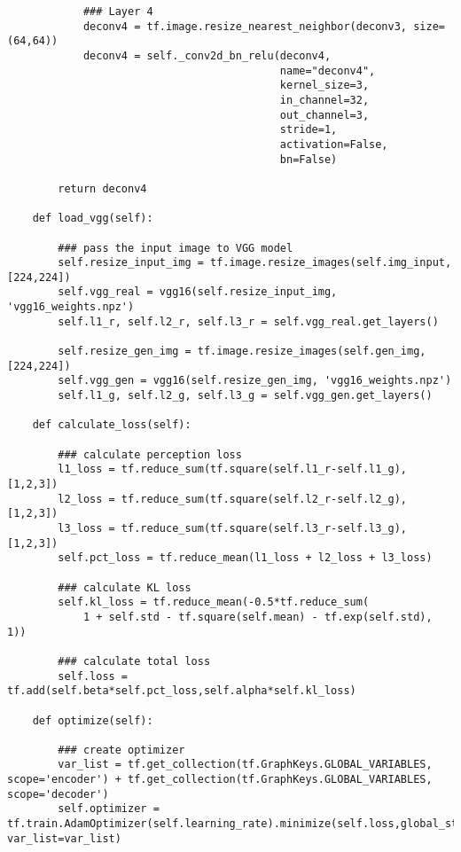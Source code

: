 \begin{footnotesize}
\begin{lstlisting}
            ### Layer 4
            deconv4 = tf.image.resize_nearest_neighbor(deconv3, size=(64,64))
            deconv4 = self._conv2d_bn_relu(deconv4,
                                           name="deconv4",
                                           kernel_size=3,
                                           in_channel=32,
                                           out_channel=3,
                                           stride=1,
                                           activation=False,
                                           bn=False)
            
        return deconv4
    
    def load_vgg(self):
        
        ### pass the input image to VGG model
        self.resize_input_img = tf.image.resize_images(self.img_input, [224,224])
        self.vgg_real = vgg16(self.resize_input_img, 'vgg16_weights.npz')
        self.l1_r, self.l2_r, self.l3_r = self.vgg_real.get_layers()
        
        self.resize_gen_img = tf.image.resize_images(self.gen_img, [224,224])
        self.vgg_gen = vgg16(self.resize_gen_img, 'vgg16_weights.npz')
        self.l1_g, self.l2_g, self.l3_g = self.vgg_gen.get_layers()
        
    def calculate_loss(self):
        
        ### calculate perception loss
        l1_loss = tf.reduce_sum(tf.square(self.l1_r-self.l1_g), [1,2,3])
        l2_loss = tf.reduce_sum(tf.square(self.l2_r-self.l2_g), [1,2,3])
        l3_loss = tf.reduce_sum(tf.square(self.l3_r-self.l3_g), [1,2,3])
        self.pct_loss = tf.reduce_mean(l1_loss + l2_loss + l3_loss)
        
        ### calculate KL loss
        self.kl_loss = tf.reduce_mean(-0.5*tf.reduce_sum(
            1 + self.std - tf.square(self.mean) - tf.exp(self.std), 1))
        
        ### calculate total loss
        self.loss = tf.add(self.beta*self.pct_loss,self.alpha*self.kl_loss)
        
    def optimize(self):
        
        ### create optimizer
        var_list = tf.get_collection(tf.GraphKeys.GLOBAL_VARIABLES, scope='encoder') + tf.get_collection(tf.GraphKeys.GLOBAL_VARIABLES, scope='decoder')
        self.optimizer = tf.train.AdamOptimizer(self.learning_rate).minimize(self.loss,global_step=self.gstep, var_list=var_list)
    

\end{lstlisting}
\end{footnotesize}
